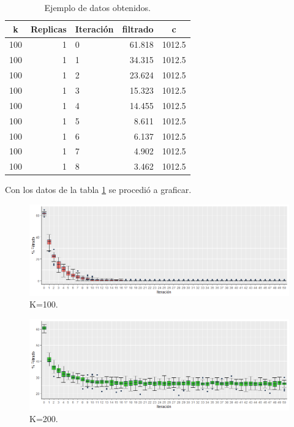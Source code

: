 \documentclass{article}
\begin{document}
 \begin{table}[h!]
\centering
\caption{Ejemplo de datos obtenidos.}
\label{tabla1}
\begin{tabular}{|l|r|l|r|r|}
\hline
\multicolumn{1}{|c|}{\textbf{k}} & \multicolumn{1}{c|}{\textbf{Replicas}} & \multicolumn{1}{c|}{\textbf{Iteración}} & \multicolumn{1}{c|}{\textbf{filtrado}} & \multicolumn{1}{c|}{\textbf{c}} \\ \hline
100 & 1 & 0 & 61.818 & 1012.5 \\ \hline
100 & 1 & 1 & 34.315 & 1012.5 \\ \hline
100 & 1 & 2 & 23.624 & 1012.5 \\ \hline
100 & 1 & 3 & 15.323 & 1012.5 \\ \hline
100 & 1 & 4 & 14.455 & 1012.5 \\ \hline
100 & 1 & 5 & 8.611 & 1012.5 \\ \hline
100 & 1 & 6 & 6.137 & 1012.5 \\ \hline
100 & 1 & 7 & 4.902 & 1012.5 \\ \hline
100 & 1 & 8 & 3.462 & 1012.5 \\ \hline
\end{tabular}
\end{table}
 Con los datos de la tabla \ref{tabla1} se procedió a graficar.
 
\begin{figure} [h!]%
\renewcommand{\figurename}{Gráfica}
    \centering
    \caption{ K=100.}
    \label{grafica1}
    \includegraphics[width=170mm]{grafica1.png} %
\end{figure}

\begin{figure} [h!]%
\renewcommand{\figurename}{Gráfica}
    \centering
    \caption{ K=200.}
    \label{grafica2}
    \includegraphics[width=170mm]{grafica2.png} %
\end{figure}
\end{document}
